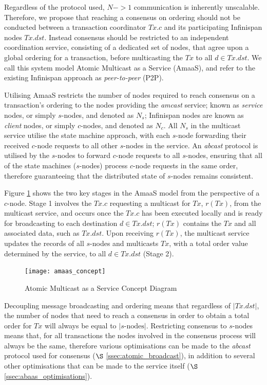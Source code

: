 Regardless of the protocol used, $N->1$ communication is inherently unscalable.  Therefore, we propose that reaching a consensus on ordering should not be conducted between a transaction coordinator $Tx.c$ and its participating Infinispan nodes $Tx.dst$.  Instead consensus should be restricted to an independent coordination service, consisting of a dedicated set of nodes, that agree upon a global ordering for a transaction, before multicasting the $Tx$ to all $d \in Tx.dst$.  We call this system model Atomic Multicast as a Service (\textsf{AmaaS}), and refer to the existing Infinispan approach as \emph{peer-to-peer} (P2P).  

Utilising \textsf{AmaaS} restricts the number of nodes required to reach consensus on a transaction's ordering to the nodes providing the \emph{amcast} service; known as \emph{service} nodes, or simply $s$-nodes, and denoted as $N_s$; Infinispan nodes are known as \emph{client} nodes, or simply $c$-nodes, and denoted as $N_c$.  All $N_s$ in the multicast service utilise the state machine approach, with each $s$-node forwarding their received $c$-node requests to all other $s$-nodes in the service.  An \emph{abcast} protocol is utilised by the $s$-nodes to forward $c$-node requests to all $s$-nodes, ensuring that all of the state machines ($s$-nodes) process $c$-node requests in the same order, therefore guaranteeing that the distributed state of $s$-nodes remains consistent.  

Figure \ref{fig:abaas_concept} shows the two key stages in the \textsf{AmaaS} model from the perspective of a $c$-node.  Stage 1 involves the $Tx.c$ requesting a multicast for $Tx$, $r(Tx)$,  from the multicast service, and occurs once the $Tx.c$ has been executed locally and is ready for broadcasting to each destination $d \in Tx.dst$; $r(Tx)$ contains the $Tx$ and all associated data, such as $Tx.dst$.  Upon receiving $r(Tx)$, the multicast service updates the records of all $s$-nodes and multicasts $Tx$, with a total order value determined by the service, to all $d \in Tx.dst$ (Stage 2).  

    \begin{figure}[htbp!] 
        \centering    
         \texttt{[image: amaas\_concept]}
         \caption[Atomic Multicast as a Service Concept Diagram]{Atomic Multicast as a Service Concept Diagram}
         \label{fig:abaas_concept}
    \end{figure}	 

Decoupling message broadcasting and ordering means that regardless of $\left\vert Tx.dst \right\vert$, the number of nodes that need to reach a consensus in order to obtain a total order for $Tx$ will always be equal to $\left\vert s\text{-nodes}\right\vert$.  Restricting consensus to $s$-nodes means that, for all transactions the nodes involved in the consensus process will always be the same, therefore various optimisations can be made to the \emph{abcast} protocol used for consensus ($\S$ \ref{ssec:atomic_broadcast}), in addition to several other optimisations that can be made to the service itself ($\S$ \ref{ssec:abaas_optimisations}).  

